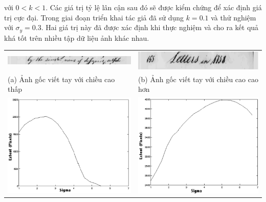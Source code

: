 \documentclass[a4paper]{article}
\begin{document}
với $0 < k < 1$. Các giá trị tỷ lệ lân cận sau đó sẽ được kiểm chứng để xác định giá trị cực đại. Trong giai đoạn triển khai tác giả đã sử dụng $k = 0.1$ và thử nghiệm với $\sigma_y = 0.3$. Hai giá trị này đã được xác định khi thực nghiệm và cho ra kết quả khá tốt trên nhiều tập dữ liệu ảnh khác nhau.

\begin{table}
\centering
\begin{tabular}{MM}
\includegraphics[scale=0.35]{imgs/a_line_img_smaller_height.png} & \includegraphics[scale=0.35]{imgs/a_line_img_larger_height.png} \\
(a) Ảnh gốc viết tay với chiều cao thấp & (b) Ảnh gốc viết tay với chiều cao cao hơn \\
\includegraphics[scale=0.35]{imgs/ploty25n4.png} & \includegraphics[scale=0.35]{imgs/ploty6n4.png}\\

\end{tabular}
\end{table}
\end{document}
